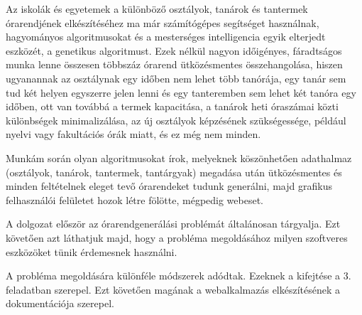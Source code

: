 
Az iskolák és egyetemek a különböző osztályok, tanárok és tantermek órarendjének 
elkészítéséhez ma már számítógépes segítséget használnak, hagyományos algoritmusokat és a
mesterséges intelligencia egyik elterjedt eszközét, a genetikus algoritmust. Ezek nélkül 
nagyon időigényes, fáradtságos munka lenne összesen többszáz órarend ütközésmentes 
összehangolása, hiszen ugyanannak az osztálynak egy időben nem lehet több tanórája, egy tanár
sem tud két helyen egyszerre jelen lenni és egy tanteremben sem lehet két tanóra egy időben,
ott van továbbá a termek kapacitása, a tanárok heti óraszámai közti különbségek 
minimalizálása, az új osztályok képzésének szükségessége, például nyelvi vagy fakultációs órák 
miatt, és ez még nem minden.

Munkám során olyan algoritmusokat írok, melyeknek köszönhetően 
adathalmaz (osztályok, tanárok, tantermek, tantárgyak) megadása után ütközésmentes és minden
feltételnek eleget tevő órarendeket tudunk generálni, majd grafikus felhasználói felületet 
hozok létre fölötte, mégpedig webeset.

A dolgozat először az órarendgenerálási problémát általánosan tárgyalja. Ezt követően azt láthatjuk majd, hogy a probléma megoldásához milyen szoftveres eszközöket tünik érdemesnek használni.

A probléma megoldására különféle módszerek adódtak. Ezeknek a kifejtése a 3. feladatban szerepel. Ezt követően magának a webalkalmazás elkészítésének a dokumentációja szerepel.

